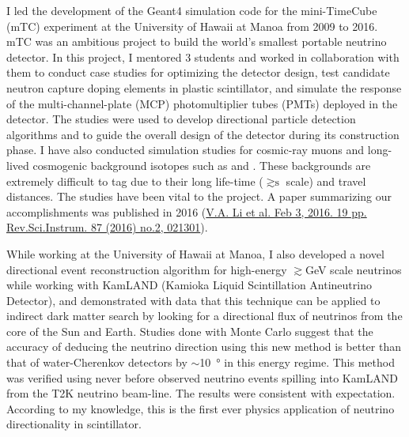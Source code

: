 \documentclass[11pt]{article} %
\begin{document}
I led the development of the Geant4 simulation code for the
mini-TimeCube (mTC) experiment at the University of Hawaii at Manoa from 2009
to 2016. mTC was an ambitious project to build the world's smallest portable
neutrino detector. In this project, I mentored 3 students and worked in
collaboration with them to conduct case studies for optimizing the detector
design, test candidate neutron capture doping elements in plastic scintillator,
and simulate the response of the multi-channel-plate (MCP) photomultiplier
tubes (PMTs) deployed in the detector. The studies were used to develop
directional particle detection algorithms and to guide the overall design of the
detector during its construction phase. I have also conducted simulation
studies for cosmic-ray muons and long-lived cosmogenic background isotopes such
as  and . These backgrounds are extremely difficult to
tag due to their long life-time ($\gtrsim \si{\second}$ scale) and travel
distances. The studies have been vital to the project. A paper summarizing our
accomplishments was published in 2016
(\href{https://arxiv.org/abs/1602.01405}{V.A. Li et al. Feb 3, 2016. 19 pp.
Rev.Sci.Instrum. 87 (2016) no.2, 021301}).

While working at the University of Hawaii at Manoa, I also developed a novel
directional event reconstruction algorithm for high-energy
$\gtrsim$\si{\giga\electronvolt} scale neutrinos while working with KamLAND
(Kamioka Liquid Scintillation Antineutrino Detector), and demonstrated with
data that this technique can be applied to indirect dark matter search by
looking for a directional flux of neutrinos from the core of the Sun and Earth.
Studies done with Monte Carlo suggest that the accuracy of deducing the
neutrino direction using this new method is better than that of water-Cherenkov
detectors by $\sim$\SI{10}{\degree} in this energy regime. This method was
verified using never before observed neutrino events spilling into KamLAND from
the T2K neutrino beam-line. The results were consistent with expectation.
According to my knowledge, this is the first ever physics application of
neutrino directionality in scintillator.

\end{document}
